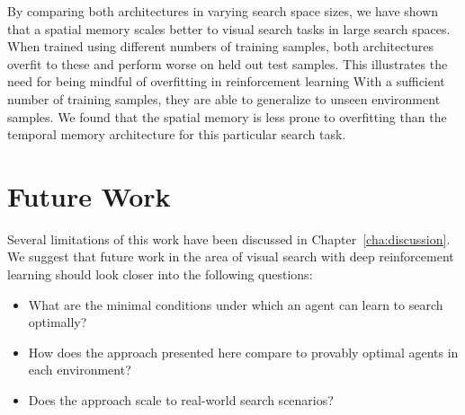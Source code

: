 By comparing both architectures in varying search space sizes, we have shown that a spatial memory scales better to visual search tasks in large search spaces.
When trained using different numbers of training samples, both architectures overfit to these and perform worse on held out test samples.
This illustrates the need for being mindful of overfitting in reinforcement learning
With a sufficient number of training samples, they are able to generalize to unseen environment samples.
We found that the spatial memory is less prone to overfitting than the temporal memory architecture for this particular search task.

\section{Future Work}

Several limitations of this work have been discussed in Chapter~\ref{cha:discussion}.
We suggest that future work in the area of visual search with deep reinforcement learning should look closer into the following questions:

\begin{itemize}
    \item What are the minimal conditions under which an agent can learn to search optimally?
    \item How does the approach presented here compare to provably optimal agents in each environment?
    \item Does the approach scale to real-world search scenarios?
\end{itemize}

